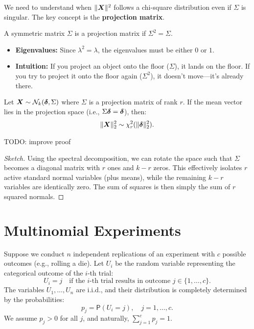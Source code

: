 We need to understand when $\|\boldsymbol{X}\|^2$ follows a chi-square distribution even if $\Sigma$ is singular. The key concept is the \textbf{projection matrix}.

\begin{definition}
    A symmetric matrix $\Sigma$ is a projection matrix if $\Sigma^2 = \Sigma$.
    \begin{itemize}
        \item \textbf{Eigenvalues:} Since $\lambda^2 = \lambda$, the eigenvalues must be either $0$ or $1$.
        \item \textbf{Intuition:} If you project an object onto the floor ($\Sigma$), it lands on the floor. If you try to project it onto the floor again ($\Sigma^2$), it doesn't move—it's already there.
    \end{itemize}
\end{definition}



\begin{lemma}
    \label{lem:dsnpg}
    Let $\boldsymbol{X} \sim \mathcal{N}_{k}(\boldsymbol{\delta}, \Sigma)$ where $\Sigma$ is a projection matrix of rank $r$. If the mean vector lies in the projection space (i.e., $\Sigma \boldsymbol{\delta} = \boldsymbol{\delta}$), then:
    \[
        \|\boldsymbol{X}\|^2_{2} \sim \chi^2_{r}(\|\boldsymbol{\delta}\|^2_{2}).
    \]
\end{lemma}
TODO: improve proof
\begin{proof}[Sketch]
    Using the spectral decomposition, we can rotate the space such that $\Sigma$ becomes a diagonal matrix with $r$ ones and $k-r$ zeros. This effectively isolates $r$ active standard normal variables (plus means), while the remaining $k-r$ variables are identically zero. The sum of squares is then simply the sum of $r$ squared normals.
\end{proof}

\section{Multinomial Experiments}
\label{sub:Multinomial Experiments}

Suppose we conduct $n$ independent replications of an experiment with $c$ possible outcomes (e.g., rolling a die).
Let $U_i$ be the random variable representing the categorical outcome of the $i$-th trial:
\[
    U_i = j \quad \text{if the $i$-th trial results in outcome } j \in \{1, \dots, c\}.
\]
The variables $U_1, \dots, U_n$ are i.i.d., and their distribution is completely determined by the probabilities:
\[
    p_j = \mathsf{P}(U_i = j), \quad j = 1, \dots, c.
\]
We assume $p_j > 0$ for all $j$, and naturally, $\sum\limits_{j=1}^{c} p_j = 1$.

